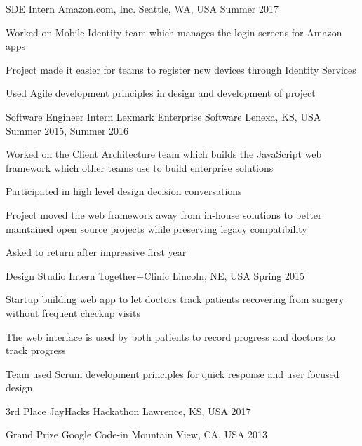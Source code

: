 \documentclass[11pt]{resume}
\begin{document}
\begin{cventries}
  \cventry
    {SDE Intern}
    {Amazon.com, Inc.}
    {Seattle, WA, USA}
    {Summer 2017}
    {
      \begin{cvitems}
      \item { Worked on Mobile Identity team which manages the login screens for
          Amazon apps }
      \item { Project made it easier for teams to register new devices through
          Identity Services }
      \item { Used Agile development principles in design and development of
          project }
      \end{cvitems}
    }

  \cventry
    {Software Engineer Intern}
    {Lexmark Enterprise Software}
    {Lenexa, KS, USA}
    {Summer 2015, Summer 2016}
    {
      \begin{cvitems}
      \item { Worked on the Client Architecture team which builds the JavaScript
          web framework which other teams use to build enterprise solutions }
      \item { Participated in high level design decision conversations }
      \item { Project moved the web framework away from in-house solutions to
          better maintained open source projects while preserving legacy
          compatibility }
      \item { Asked to return after impressive first year }
      \end{cvitems}
    }

  \cventry
    {Design Studio Intern}
    {Together+Clinic}
    {Lincoln, NE, USA}
    {Spring 2015}
    {
      \begin{cvitems}
      \item { Startup building web app to let doctors track patients recovering
          from surgery without frequent checkup visits }
      \item { The web interface is used by both patients to record progress and
          doctors to track progress }
      \item { Team used Scrum development principles for quick response and user
          focused design }
      \end{cvitems}
    }

  \end{cventries}


\begin{cvhonors}

  \cvhonor
    {3rd Place}
    {JayHacks Hackathon}
    {Lawrence, KS, USA}
    {2017}

  \cvhonor
    {Grand Prize}
    {Google Code-in}
    {Mountain View, CA, USA}
    {2013}

\end{cvhonors}
\end{document}
